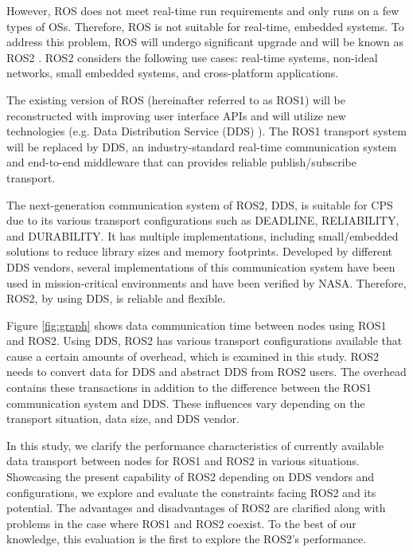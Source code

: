 \documentclass{sig-alternate-ipsn13}
\begin{document}
However, ROS does not meet real-time run requirements and only runs on a few types of OSs. Therefore, ROS is not suitable for real-time, embedded systems. To address this problem, ROS will undergo significant upgrade and will be known as ROS2 \cite{ros2_iccps2016}. ROS2 considers the following use cases: real-time systems, non-ideal networks, small embedded systems, and cross-platform applications.

The existing version of ROS (hereinafter referred to as ROS1) will be reconstructed with improving user interface APIs and will utilize new technologies (e.g. Data Distribution Service (DDS) \cite{pardo2003omg}). The ROS1 transport system will be replaced by DDS, an industry-standard real-time communication system and end-to-end middleware that can provides reliable publish/subscribe transport.

The next-generation communication system of ROS2, DDS, is suitable for CPS due to its various transport configurations such as DEADLINE, RELIABILITY, and DURABILITY. It has multiple implementations, including small/embedded solutions to reduce library sizes and memory footprints. Developed by different DDS vendors, several implementations of this communication system have been used in mission-critical environments and have been verified by NASA. Therefore, ROS2, by using DDS, is reliable and flexible.

Figure \ref{fig:graph} shows data communication time between nodes using ROS1 and ROS2. Using DDS, ROS2 has various transport configurations available that cause a certain amounts of overhead, which is examined in this study. ROS2 needs to convert data for DDS and abstract DDS from ROS2 users. The overhead contains these transactions in addition to the difference between the ROS1 communication system and DDS. These influences vary depending on the transport situation, data size, and DDS vendor.

In this study, we clarify the performance characteristics of currently available data transport between nodes for ROS1 and ROS2 in various situations. Showcasing the present capability of ROS2 depending on DDS vendors and configurations, we explore and evaluate the constraints facing ROS2 and its potential. The advantages and disadvantages of ROS2 are clarified along with problems in the case where ROS1 and ROS2 coexist. To the best of our knowledge, this evaluation is the first to explore the ROS2's performance.

\end{document}
